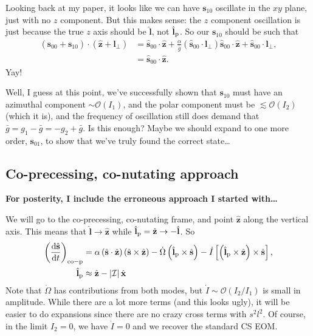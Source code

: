 \documentclass[12pt]{article}
\newcommand*{\rd}[2]{\frac{\mathrm{d}#1}{\mathrm{d}#2}}
\newcommand*{\bm}[1]{\boldsymbol{\mathbf{#1}}}
\newcommand*{\uv}[1]{\hat{\bm{#1}}}
\newcommand*{\abs}[1]{\left|#1\right|}
\newcommand*{\p}[1]{\left(#1\right)}
\newcommand*{\s}[1]{\left[#1\right]}
\begin{document}
Looking back at my paper, it looks like we can have $\bm{s}_{10}$ oscillate in
the $xy$ plane, just with no $z$ component.
But this makes sense: the $z$ component oscillation is just because the true
$z$ axis should be $\uv{l}$, not $\uv{l}_{\rm p}$.
So our $\bm{s}_{10}$ should be such that
\begin{align}
    \p{\uv{s}_{00} + \bm{s}_{10}} \cdot \p{\uv{z} + \bm{l}_{\perp}}
        &= \uv{s}_{00} \cdot \uv{z}
            + \frac{\alpha}{\bar{g}}\p{\uv{s}_{00} \cdot \bm{l}_{\perp}}
                \uv{s}_{00} \cdot \uv{z}
            + \uv{s}_{00} \cdot \bm{l}_{\perp},\\
        &= \uv{s}_{00} \cdot \uv{z}.
\end{align}
Yay!

Well, I guess at this point, we've successfully shown that $\bm{s}_{10}$ must
have an azimuthal component $\sim \mathcal{O}\p{I_1}$, and the polar component
must be $\lesssim \mathcal{O}\p{I_2}$ (which it is), and the frequency of
oscillation still does demand that $\bar{g} = g_1 - \bar{g} = -g_2 + \bar{g}$.
Is this enough? Maybe we should expand to one more order, $\bm{s}_{01}$, to show
that we've truly found the correct state\dots

\subsection{Co-precessing, co-nutating approach}

\textbf{For posterity, I include the erroneous approach I started with\dots}

We will go to the co-precessing, co-nutating frame, and point $\uv{z}$ along the
vertical axis.
This means that $\uv{l} \to \uv{z}$ while $\uv{l}_{\rm p} = \uv{z} \to -\uv{l}$.
So
\begin{align}
    \p{\rd{\uv{s}}{t}}_{\rm co-p}
        &=
            \alpha\p{\uv{s} \cdot \uv{z}}
                \p{\uv{s} \times \uv{z}}
                - \dot{\Omega}\p{\uv{l}_{\rm p} \times \uv{s}}
                - \dot{I}\s{\p{\uv{l}_{\rm p} \times \uv{z}} \times \uv{s}}
                ,\\
    \uv{l}_{\rm p}
        &\approx
            \uv{z}
            - \abs{\mathcal{I}} \uv{x}
\end{align}
Note that $\dot{\Omega}$ has contributions from both modes, but $\dot{I} \sim
\mathcal{O}(I_2 / I_1)$ is small in amplitude.
While there are a lot more terms (and this looks ugly), it will be easier to do
expansions since there are no crazy cross terms with $s^2l^2$.
Of course, in the limit $I_2 = 0$, we have $\dot{I} = 0$ and we recover the
standard CS EOM\@.
\end{document}
